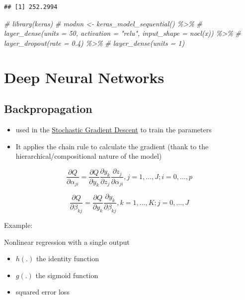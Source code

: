 \documentclass[
]{book}
\newenvironment{Shaded}{\begin{snugshade}}{\end{snugshade}}
\newcommand{\CommentTok}[1]{\textcolor[rgb]{0.56,0.35,0.01}{\textit{#1}}}
\begin{document}
\begin{verbatim}
## [1] 252.2994
\end{verbatim}

\begin{Shaded}
\begin{Highlighting}[]
\CommentTok{\# library(keras)}
\CommentTok{\# modnn \textless{}{-} keras\_model\_sequential() \%\textgreater{}\% }
\CommentTok{\#     layer\_dense(units = 50, activation = "relu", input\_shape = nocl(x)) \%\textgreater{}\% }
\CommentTok{\#     layer\_dropout(rate = 0.4) \%\textgreater{}\% }
\CommentTok{\#     layer\_dense(units = 1)}
\end{Highlighting}
\end{Shaded}

\hypertarget{deep-neural-networks}{%
\section{Deep Neural Networks}\label{deep-neural-networks}}

\hypertarget{backpropagation}{%
\subsection{Backpropagation}\label{backpropagation}}

\begin{itemize}
\item
  used in the \protect\hyperlink{stochastic-gradient-descent}{Stochastic Gradient Descent} to train the parameters
\item
  It applies the chain rule to calculate the gradient (thank to the hierarchical/compositional nature of the model)
\end{itemize}

\[
\frac{\partial Q}{\partial \alpha_{ji}} = \frac{\partial Q}{\partial y_k} \frac{\partial y_k}{\partial z_j} \frac{\partial z_j}{\partial \alpha_{ji}} , j = 1, \dots, J; i = 0, \dots, p
\]

\[
\frac{\partial Q}{\partial \beta_{kj}} = \frac{\partial Q}{\partial y_k} \frac{\partial y_k}{\partial \beta_{kj}} , k = 1, \dots, K; j = 0, \dots, J
\]

Example:

Nonlinear regression with a single output

\begin{itemize}
\item
  \(h(.)\) the identity function
\item
  \(g(.)\) the sigmoid function
\item
  squared error loss
\end{itemize}
\end{document}
